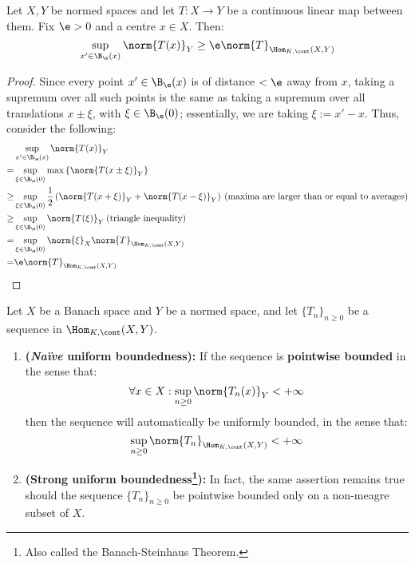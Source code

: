         \begin{lemma} \label{lemma: suprema_of_averages}
            Let $X, Y$ be normed spaces and let $T: X \to Y$ be a continuous linear map between them. Fix $\e > 0$ and a centre $x \in X$. Then:
                $$\sup_{x' \in \B_{\e}(x)} \norm{T(x)}_Y \geq \e \norm{T}_{\Hom_{K, \cont}(X, Y)}$$
        \end{lemma}
            \begin{proof}
                Since every point $x' \in \B_{\e}(x)$ is of distance $< \e$ away from $x$, taking a supremum over all such points is the same as taking a supremum over all translations $x \pm \xi$, with $\xi \in \B_{\e}(0)$; essentially, we are taking $\xi := x' - x$. Thus, consider the following:
                    $$
                        \begin{aligned}
                            & \sup_{x' \in \B_{\e}(x)} \norm{T(x)}_Y
                            \\
                            = & \sup_{\xi \in \B_{\e}(0)} \max\left\{ \norm{T(x \pm \xi)}_Y \right\}
                            \\
                            \geq & \sup_{\xi \in \B_{\e}(0)} \frac12\left( \norm{T(x + \xi)}_Y + \norm{T(x - \xi)}_Y \right) \: \text{(maxima are larger than or equal to averages)}
                            \\
                            \geq & \sup_{\xi \in \B_{\e}(0)} \norm{T(\xi)}_Y \: \text{(triangle inequality)}
                            \\
                            = & \sup_{\xi \in \B_{\e}(0)} \norm{\xi}_X \norm{T}_{\Hom_{K, \cont}(X, Y)}
                            \\
                            = & \e \norm{T}_{\Hom_{K, \cont}(X, Y)}
                        \end{aligned}
                    $$
            \end{proof}
        \begin{theorem} \label{theorem: uniform_boundedness}
            Let $X$ be a Banach space and $Y$ be a normed space, and let $\{T_n\}_{n \geq 0}$ be a sequence in $\Hom_{K, \cont}(X, Y)$.
            \begin{enumerate}
                \item \textbf{(\textit{Na\"ive} uniform boundedness):} If the sequence is \textbf{pointwise bounded} in the sense that:
                    $$\forall x \in X: \sup_{n \geq 0} \norm{ T_n(x) }_Y < +\infty$$
                then the sequence will automatically be uniformly bounded, in the sense that:
                    $$\sup_{n \geq 0} \norm{T_n}_{\Hom_{K, \cont}(X, Y)} < +\infty$$
                \item \textbf{(Strong uniform boundedness\footnote{Also called the Banach-Steinhaus Theorem.}):} In fact, the same assertion remains true should the sequence $\{T_n\}_{n \geq 0}$ be pointwise bounded only on a non-meagre subset of $X$. 
            \end{enumerate}
        \end{theorem}
